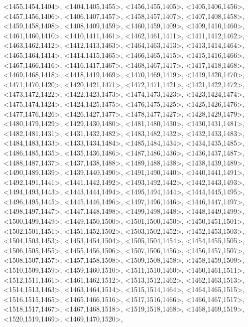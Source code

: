 \documentclass[a4paper,10pt]{article}
\begin{document}
\begin{eulernotebook}
\begin{euleroutput}
  <1455,1454,1404>,
  <1404,1405,1455>,
  <1456,1455,1405>,
  <1405,1406,1456>,
  <1457,1456,1406>,
  <1406,1407,1457>,
  <1458,1457,1407>,
  <1407,1408,1458>,
  <1459,1458,1408>,
  <1408,1409,1459>,
  <1460,1459,1409>,
  <1409,1410,1460>,
  <1461,1460,1410>,
  <1410,1411,1461>,
  <1462,1461,1411>,
  <1411,1412,1462>,
  <1463,1462,1412>,
  <1412,1413,1463>,
  <1464,1463,1413>,
  <1413,1414,1464>,
  <1465,1464,1414>,
  <1414,1415,1465>,
  <1466,1465,1415>,
  <1415,1416,1466>,
  <1467,1466,1416>,
  <1416,1417,1467>,
  <1468,1467,1417>,
  <1417,1418,1468>,
  <1469,1468,1418>,
  <1418,1419,1469>,
  <1470,1469,1419>,
  <1419,1420,1470>,
  <1471,1470,1420>,
  <1420,1421,1471>,
  <1472,1471,1421>,
  <1421,1422,1472>,
  <1473,1472,1422>,
  <1422,1423,1473>,
  <1474,1473,1423>,
  <1423,1424,1474>,
  <1475,1474,1424>,
  <1424,1425,1475>,
  <1476,1475,1425>,
  <1425,1426,1476>,
  <1477,1476,1426>,
  <1426,1427,1477>,
  <1478,1477,1427>,
  <1428,1429,1479>,
  <1480,1479,1429>,
  <1429,1430,1480>,
  <1481,1480,1430>,
  <1430,1431,1481>,
  <1482,1481,1431>,
  <1431,1432,1482>,
  <1483,1482,1432>,
  <1432,1433,1483>,
  <1484,1483,1433>,
  <1433,1434,1484>,
  <1485,1484,1434>,
  <1434,1435,1485>,
  <1486,1485,1435>,
  <1435,1436,1486>,
  <1487,1486,1436>,
  <1436,1437,1487>,
  <1488,1487,1437>,
  <1437,1438,1488>,
  <1489,1488,1438>,
  <1438,1439,1489>,
  <1490,1489,1439>,
  <1439,1440,1490>,
  <1491,1490,1440>,
  <1440,1441,1491>,
  <1492,1491,1441>,
  <1441,1442,1492>,
  <1493,1492,1442>,
  <1442,1443,1493>,
  <1494,1493,1443>,
  <1443,1444,1494>,
  <1495,1494,1444>,
  <1444,1445,1495>,
  <1496,1495,1445>,
  <1445,1446,1496>,
  <1497,1496,1446>,
  <1446,1447,1497>,
  <1498,1497,1447>,
  <1447,1448,1498>,
  <1499,1498,1448>,
  <1448,1449,1499>,
  <1500,1499,1449>,
  <1449,1450,1500>,
  <1501,1500,1450>,
  <1450,1451,1501>,
  <1502,1501,1451>,
  <1451,1452,1502>,
  <1503,1502,1452>,
  <1452,1453,1503>,
  <1504,1503,1453>,
  <1453,1454,1504>,
  <1505,1504,1454>,
  <1454,1455,1505>,
  <1506,1505,1455>,
  <1455,1456,1506>,
  <1507,1506,1456>,
  <1456,1457,1507>,
  <1508,1507,1457>,
  <1457,1458,1508>,
  <1509,1508,1458>,
  <1458,1459,1509>,
  <1510,1509,1459>,
  <1459,1460,1510>,
  <1511,1510,1460>,
  <1460,1461,1511>,
  <1512,1511,1461>,
  <1461,1462,1512>,
  <1513,1512,1462>,
  <1462,1463,1513>,
  <1514,1513,1463>,
  <1463,1464,1514>,
  <1515,1514,1464>,
  <1464,1465,1515>,
  <1516,1515,1465>,
  <1465,1466,1516>,
  <1517,1516,1466>,
  <1466,1467,1517>,
  <1518,1517,1467>,
  <1467,1468,1518>,
  <1519,1518,1468>,
  <1468,1469,1519>,
  <1520,1519,1469>,
  <1469,1470,1520>,

\end{euleroutput}
\end{eulernotebook}
\end{document}
